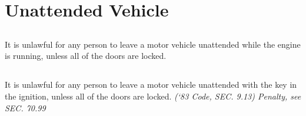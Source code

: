 \section{Unattended Vehicle}
\subsection{}
It is unlawful for any person to leave a motor vehicle unattended while the engine is running, unless all of the doors are locked.
\subsection{}
It is unlawful for any person to leave a motor vehicle unattended with the key in the ignition, unless all of the doors are locked.\newline
\emph{(‘83 Code, SEC. 9.13)  Penalty, see SEC. 70.99}
